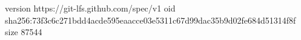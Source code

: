 version https://git-lfs.github.com/spec/v1
oid sha256:73f3c6c271bdd4acde595eaacce03e5311c67d99dac35b9d02fe684d51314f8f
size 87544
